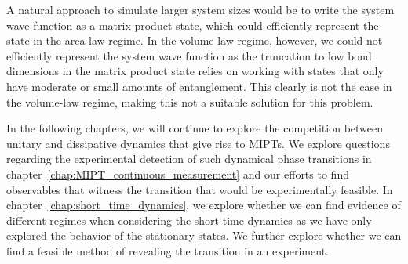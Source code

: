 A natural approach to simulate larger system sizes would be to write the system wave function as a matrix product state, which could efficiently represent the state in the area-law regime. In the volume-law regime, however, we could not efficiently represent the system wave function as the truncation to low bond dimensions in the matrix product state relies on working with states that only have moderate or small amounts of entanglement. This clearly is not the case in the volume-law regime, making this not a suitable solution for this problem. 

In the following chapters, we will continue to explore the competition between unitary and dissipative dynamics that give rise to MIPTs. We explore questions regarding the experimental detection of such dynamical phase transitions in chapter~\ref{chap:MIPT_continuous_measurement} and our efforts to find observables that witness the transition that would be experimentally feasible. In chapter~\ref{chap:short_time_dynamics}, we explore whether we can find evidence of different regimes when considering the short-time dynamics as we have only explored the behavior of the stationary states. We further explore whether we can find a feasible method of revealing the transition in an experiment. 
